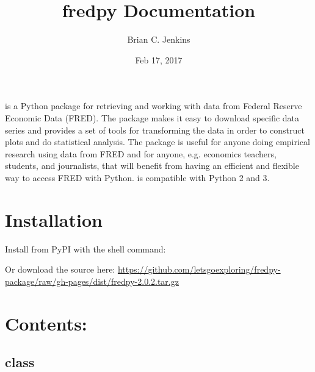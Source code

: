 \documentclass[letterpaper,10pt,openany,oneside,english]{sphinxmanual}
\title{fredpy Documentation}
\date{Feb 17, 2017}
\author{Brian C. Jenkins}
\begin{document}
\maketitle
\sphinxtableofcontents
{}\label{\detokenize{index::doc}}


 is a Python package for retrieving and working with data from Federal Reserve Economic Data (FRED). The package makes it easy to download specific data series and provides a set of tools for transforming the data in order to construct plots and do statistical analysis. The  package is useful for anyone doing empirical research using data from FRED and for anyone, e.g. economics teachers, students, and journalists, that will benefit from having an efficient and flexible way to access FRED with Python.  is compatible with Python 2 and 3.


\chapter{Installation}
\label{\detokenize{index:installation}}\label{\detokenize{index:about-fredpy}}
Install  from PyPI with the shell command:

\begin{sphinxVerbatim}[commandchars=\\\{\}]
  
\end{sphinxVerbatim}

Or download the source here: \url{https://github.com/letsgoexploring/fredpy-package/raw/gh-pages/dist/fredpy-2.0.2.tar.gz}


\chapter{Contents:}
\label{\detokenize{index:contents}}

\section{ class}
\label{\detokenize{series_class::doc}}\label{\detokenize{series_class:fredpy-series-class}}
\end{document}
